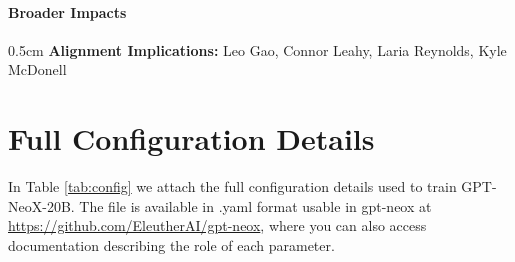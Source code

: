 \documentclass{article}
\newcommand{\model}{GPT-NeoX-20B}
\begin{document}
\paragraph{Broader Impacts}
\begin{adjustwidth}{0.5cm}{}
\textbf{Alignment Implications:} Leo Gao, Connor Leahy, Laria Reynolds, Kyle McDonell
\end{adjustwidth}

\section{Full Configuration Details}\label{app:hparam}

In Table \ref{tab:config} we attach the full configuration details used to train \model{}. The file is available in .yaml format usable in gpt-neox at \url{https://github.com/EleutherAI/gpt-neox}, where you can also access documentation describing the role of each parameter.
\end{document}
